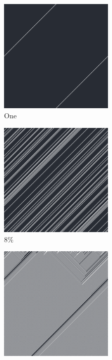 \documentclass[12pt, fleqn]{report}                             %
\theoremstyle{break}                                            %
\begin{document}
      \begin{figure}[ht!]
        \centering
        \begin{subfigure}[b]{0.4\linewidth}
          \includegraphics[width=0.6\textwidth]{Images/142/a.png}
          \caption{One}
        \end{subfigure}
        \begin{subfigure}[b]{0.4\linewidth}
          \includegraphics[width=0.6\textwidth]{Images/142/b.png}
          \caption{8\%}
        \end{subfigure}
        \begin{subfigure}[b]{0.4\linewidth}
          \includegraphics[width=0.6\textwidth]{Images/142/c.png}

\end{subfigure}
\end{figure}
\end{document}
